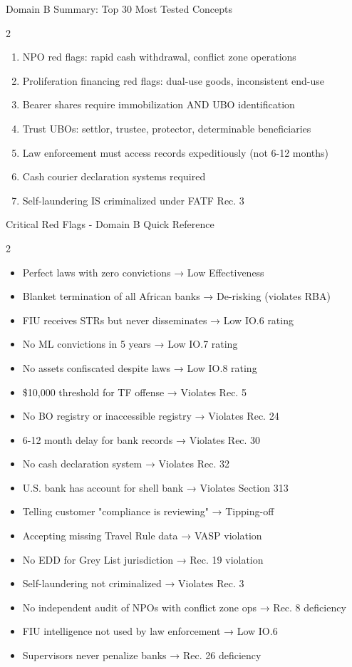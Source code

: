 \documentclass[11pt,a4paper]{beamer}
\begin{document}
\begin{frame}{Domain B Summary: Top 30 Most Tested Concepts}
\begin{multicols}{2}
\begin{enumerate}
				\item NPO red flags: rapid cash withdrawal, conflict zone operations
				\item Proliferation financing red flags: dual-use goods, inconsistent end-use
				\item Bearer shares require immobilization AND UBO identification
				\item Trust UBOs: settlor, trustee, protector, determinable beneficiaries
				\item Law enforcement must access records expeditiously (not 6-12 months)
				\item Cash courier declaration systems required
				\item Self-laundering IS criminalized under FATF Rec. 3
			\end{enumerate}
		\end{multicols}
	\end{frame}
	
	\begin{frame}{Critical Red Flags - Domain B Quick Reference}
		\begin{multicols}{2}
			\begin{itemize}
				\item Perfect laws with zero convictions → Low Effectiveness
				\item Blanket termination of all African banks → De-risking (violates RBA)
				\item FIU receives STRs but never disseminates → Low IO.6 rating
				\item No ML convictions in 5 years → Low IO.7 rating
				\item No assets confiscated despite laws → Low IO.8 rating
				\item \$10,000 threshold for TF offense → Violates Rec. 5
				\item No BO registry or inaccessible registry → Violates Rec. 24
				\item 6-12 month delay for bank records → Violates Rec. 30
				\item No cash declaration system → Violates Rec. 32
				\item U.S. bank has account for shell bank → Violates Section 313
				\item Telling customer "compliance is reviewing" → Tipping-off
				\item Accepting missing Travel Rule data → VASP violation
				\item No EDD for Grey List jurisdiction → Rec. 19 violation
				\item Self-laundering not criminalized → Violates Rec. 3
				\item No independent audit of NPOs with conflict zone ops → Rec. 8 deficiency
				\item FIU intelligence not used by law enforcement → Low IO.6
				\item Supervisors never penalize banks → Rec. 26 deficiency
			\end{itemize}
		\end{multicols}
	\end{frame}
	
\end{document}
